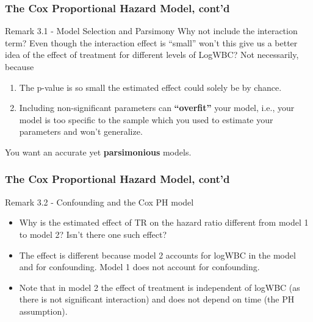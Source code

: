 \documentclass{beamer}
\theoremstyle{definition}
\begin{document}
\begin{frame}
\frametitle{The Cox Proportional Hazard Model, cont'd}
\begin{block}{Remark 3.1 - Model Selection and Parsimony}
Why not include the interaction term? Even though the interaction effect is ``small'' won't this give us a better idea of the effect of treatment for different levels of LogWBC? Not necessarily, because
\begin{enumerate}
\item The p-value is so small the estimated effect could solely be by chance.
\item Including non-significant parameters can \textbf{``overfit''} your model, i.e., your model is too specific to the sample which you used to estimate your parameters and won't generalize.
\end{enumerate}
You want an accurate yet \textbf{parsimonious} models.
\end{block}
\end{frame}

\begin{frame}
\frametitle{The Cox Proportional Hazard Model, cont'd}
\begin{block}{Remark 3.2 - Confounding and the Cox PH model}
\begin{itemize}
\item  Why is the estimated effect of TR on the hazard ratio different from model 1 to model 2? Isn't there one such effect?
\item The effect is different because model 2 accounts for logWBC in the model and for confounding.  Model 1 does not account for confounding.
\item Note that in model 2 the effect of treatment is independent of logWBC (as there is not significant interaction) and does not depend on time (the PH assumption).
\end{itemize}
\end{block}
\end{frame}
\end{document}
